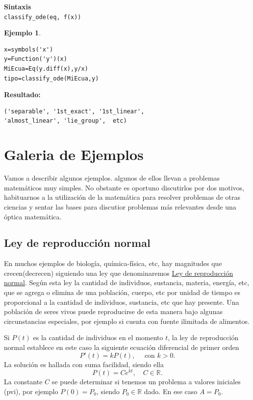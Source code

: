 \documentclass{article}
\newcommand{\rr}{\mathbb{R}}
\newtheorem{ejemplo}{Ejemplo}}
\begin{document}
\begin{codigo}
\textbf{Sintaxis}\\
\texttt{classify\_ode(eq, f(x))}\\

\end{codigo}
\begin{ejemplo}

\end{ejemplo}

\begin{lstlisting}
x=symbols('x')
y=Function('y')(x)
MiEcua=Eq(y.diff(x),y/x)
tipo=classify_ode(MiEcua,y)
\end{lstlisting}
\textbf{Resultado:}\\
\begin{verbatim}
('separable', '1st_exact', '1st_linear', 
'almost_linear', 'lie_group',  etc)
\end{verbatim}




\section{Galeria de Ejemplos}

Vamos a describir algunos ejemplos. algunos de ellos llevan a problemas matemáticos muy simples. No obstante es oportuno discutirlos por dos motivos, habituarnos a la utilización de la matemática para resolver problemas de otras ciencias y sentar las bases para discutior problemas más relevantes desde una óptica matemática.

\subsection{Ley de reproducción normal}
  En muchos ejemplos de biología, química-física, etc, hay magnitudes que crecen(decrecen) siguiendo una ley que denominaremos
\href{http://es.wikipedia.org/wiki/Crecimiento_exponencial}{Ley de reproducción  normal}. Según esta ley la cantidad de individuos, sustancia, materia,
energía, etc, que se agrega o elimina de una población, cuerpo, etc por unidad de tiempo es proporcional a la cantidad de individuos, sustancia, etc que hay presente.   Una población de seres vivos puede reproducirse de esta manera bajo algunas circunstancias
especiales, por ejemplo si cuenta con fuente ilimitada de alimentos.

  Si $P(t)$ es la cantidad de individuos en el momento $t$, la ley de reproducción normal establece
en este caso la siguiente ecuación diferencial de primer orden
\[P'(t)=kP(t),\quad\text{ con } k>0.\]
La solución es hallada con suma facilidad, siendo ella 
\[\boxed{P(t)=Ce^{kt},\quad C\in\rr.}\]
La constante  $C$ se puede determinar si tenemos un problema a valores iniciales (pvi), por ejemplo $P(0)=P_0$, siendo $P_0\in\rr$ dado. En ese caso
$A=P_0$. 
\end{document}
